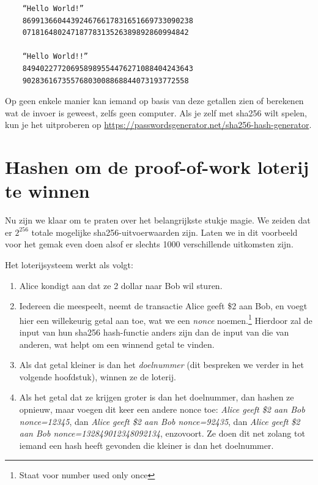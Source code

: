 \documentclass[smalldemyvopaper,11pt,twoside,onecolumn,openright,extrafontsizes]{memoir}
\begin{document}
\begin{verbatim}
    “Hello World!”
    869913660443924676617831651669733090238
    07181648024718778313526389892860994842
   
    “Hello World!!”
    849402277206958989554476271088404243643
    90283616735576803008868844073193772558
    \end{verbatim}

Op geen enkele manier kan iemand op basis van deze getallen zien of berekenen wat de invoer is geweest, zelfs geen computer. Als je zelf met sha256 wilt spelen, kun je het uitproberen op \href{https://passwordsgenerator.net/sha256-hash-generator}{https://passwordsgenerator.net/sha256-hash-generator}.

\section{Hashen om de proof-of-work loterij te winnen}

Nu zijn we klaar om te praten over het belangrijkste stukje magie. We zeiden dat er $2^{256}$ totale mogelijke sha256-uitvoerwaarden zijn. Laten we in dit voorbeeld voor het gemak even doen alsof er slechts 1000 verschillende uitkomsten zijn.

Het loterijsysteem werkt als volgt:

\begin{enumerate}
    \item Alice kondigt aan dat ze 2 dollar naar \mbox{Bob} wil sturen.
    \item Iedereen die meespeelt, neemt de transactie \textquotedbl{}Alice geeft \$2 aan Bob\textquotedbl{}, en voegt hier een willekeurig getal aan toe, wat we een \textit{nonce} noemen.\footnote{Staat voor \textquotedbl{}number used only once\textquotedbl{}} Hierdoor zal de input van hun sha256 hash-functie anders zijn dan de input van die van anderen, wat helpt om een winnend getal te vinden.
    \item Als dat getal kleiner is dan het \textit{doelnummer} (dit bespreken we verder in het volgende hoofdstuk), winnen ze de loterij.
    \item Als het getal dat ze krijgen groter is dan het doelnummer, dan hashen ze opnieuw, maar voegen dit keer een andere nonce toe: \textit{\textquotedbl{}Alice geeft \$2 aan Bob nonce=12345\textquotedbl{}}, dan \textit{\textquotedbl{}Alice geeft \$2 aan Bob nonce=92435\textquotedbl{}}, dan \textit{\textquotedbl{}Alice geeft \$2 aan Bob nonce=132849012348092134\textquotedbl{}}, enzovoort. Ze doen dit net zolang tot iemand een hash heeft gevonden die kleiner is dan het doelnummer.
 \end{enumerate}   
 
\end{document}
